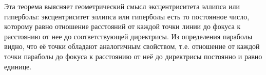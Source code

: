 Эта теорема выясняет геометрический смысл эксцентриситета эллипса
или гиперболы: эксцентриситет эллипса или гиперболы есть то постоянное
число, которому равно отношение расстояний от каждой точки линии до фокуса к расстоянию от нее до соответствующей директрисы. Из определения
параболы видно, что её точки обладают аналогичным свойством, т.е. отношение от каждой точки параболы до фокуса к расстоянию от неё до директрисы
постоянно и равно единице.

